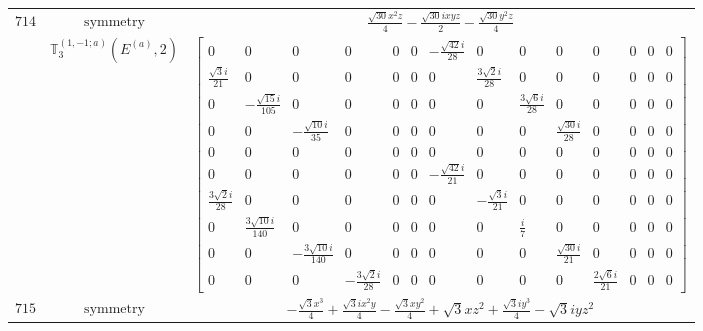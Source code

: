 \documentclass[fleqn,8pt,landscape]{jsarticle}
\begin{document}
\begin{longtable}{ccc}
$ 714 $ & $ \text{symmetry} $ & $ \frac{\sqrt{30} x^{2} z}{4} - \frac{\sqrt{30} i x y z}{2} - \frac{\sqrt{30} y^{2} z}{4} $ \\
$  $ & $ \mathbb{T}_{3}^{(1,-1;a)}(E^{(a)},2) $ & $ \begin{bmatrix} 0 & 0 & 0 & 0 & 0 & 0 & - \frac{\sqrt{42} i}{28} & 0 & 0 & 0 & 0 & 0 & 0 & 0 \\ \frac{\sqrt{3} i}{21} & 0 & 0 & 0 & 0 & 0 & 0 & \frac{3 \sqrt{2} i}{28} & 0 & 0 & 0 & 0 & 0 & 0 \\ 0 & - \frac{\sqrt{15} i}{105} & 0 & 0 & 0 & 0 & 0 & 0 & \frac{3 \sqrt{6} i}{28} & 0 & 0 & 0 & 0 & 0 \\ 0 & 0 & - \frac{\sqrt{10} i}{35} & 0 & 0 & 0 & 0 & 0 & 0 & \frac{\sqrt{30} i}{28} & 0 & 0 & 0 & 0 \\ 0 & 0 & 0 & 0 & 0 & 0 & 0 & 0 & 0 & 0 & 0 & 0 & 0 & 0 \\ 0 & 0 & 0 & 0 & 0 & 0 & - \frac{\sqrt{42} i}{21} & 0 & 0 & 0 & 0 & 0 & 0 & 0 \\ \frac{3 \sqrt{2} i}{28} & 0 & 0 & 0 & 0 & 0 & 0 & - \frac{\sqrt{3} i}{21} & 0 & 0 & 0 & 0 & 0 & 0 \\ 0 & \frac{3 \sqrt{10} i}{140} & 0 & 0 & 0 & 0 & 0 & 0 & \frac{i}{7} & 0 & 0 & 0 & 0 & 0 \\ 0 & 0 & - \frac{3 \sqrt{10} i}{140} & 0 & 0 & 0 & 0 & 0 & 0 & \frac{\sqrt{30} i}{21} & 0 & 0 & 0 & 0 \\ 0 & 0 & 0 & - \frac{3 \sqrt{2} i}{28} & 0 & 0 & 0 & 0 & 0 & 0 & \frac{2 \sqrt{6} i}{21} & 0 & 0 & 0 \end{bmatrix} $ \\ \hline
$ 715 $ & $ \text{symmetry} $ & $ - \frac{\sqrt{3} x^{3}}{4} + \frac{\sqrt{3} i x^{2} y}{4} - \frac{\sqrt{3} x y^{2}}{4} + \sqrt{3} x z^{2} + \frac{\sqrt{3} i y^{3}}{4} - \sqrt{3} i y z^{2} $ \\

\end{longtable}
\end{document}

